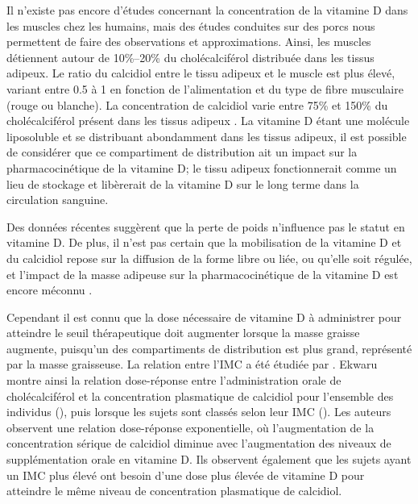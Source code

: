 \documentclass[
  a4paper,
  DIV=11,
  numbers=noendperiod,
  listof=totoc]{scrreprt}
\begin{document}
Il n'existe pas encore d'études concernant la concentration de la
vitamine D dans les muscles chez les humains, mais des études conduites
sur des porcs nous permettent de faire des observations et
approximations. Ainsi, les muscles détiennent autour de 10\%--20\% du
cholécalciférol distribuée dans les tissus adipeux. Le ratio du
calcidiol entre le tissu adipeux et le muscle est plus élevé, variant
entre 0.5 à 1 en fonction de l'alimentation et du type de fibre
musculaire (rouge ou blanche). La concentration de calcidiol varie entre
75\% et 150\% du cholécalciférol présent dans les tissus adipeux
\autocite{Schoenmakers.2018}. La vitamine D étant une molécule
liposoluble et se distribuant abondamment dans les tissus adipeux, il
est possible de considérer que ce compartiment de distribution ait un
impact sur la pharmacocinétique de la vitamine D; le tissu adipeux
fonctionnerait comme un lieu de stockage et libèrerait de la vitamine D
sur le long terme dans la circulation sanguine.

Des données récentes suggèrent que la perte de poids n'influence pas le
statut en vitamine D. De plus, il n'est pas certain que la mobilisation
de la vitamine D et du calcidiol repose sur la diffusion de la forme
libre ou liée, ou qu'elle soit régulée, et l'impact de la masse adipeuse
sur la pharmacocinétique de la vitamine D est encore méconnu
\autocite{Schoenmakers.2018}.

Cependant il est connu que la dose nécessaire de vitamine D à
administrer pour atteindre le seuil thérapeutique doit augmenter lorsque
la masse graisse augmente, puisqu'un des compartiments de distribution
est plus grand, représenté par la masse graisseuse. La relation entre
l'\ac{IMC} a été étudiée par \textcite{Ekwaru.2014}. Ekwaru montre ainsi
la relation dose-réponse entre l'administration orale de cholécalciférol
et la concentration plasmatique de calcidiol pour l'ensemble des
individus (), puis lorsque les sujets sont
classés selon leur \ac{IMC} (). Les auteurs
observent une relation dose-réponse exponentielle, où l'augmentation de
la concentration sérique de calcidiol diminue avec l'augmentation des
niveaux de supplémentation orale en vitamine D. Ils observent également
que les sujets ayant un \ac{IMC} plus élevé ont besoin d'une dose plus
élevée de vitamine D pour atteindre le même niveau de concentration
plasmatique de calcidiol.
\end{document}
